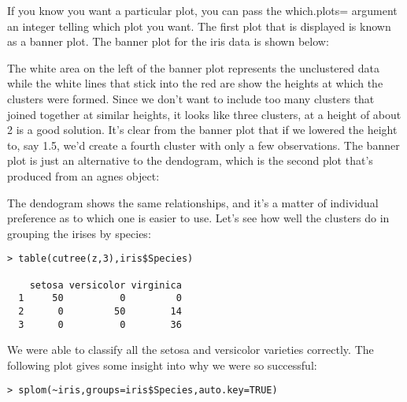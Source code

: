 If you know you want a particular plot, you can pass the which.plots= argument an integer telling which plot you want.
The first plot that is displayed is known as a banner plot. The banner plot for the iris data is shown below:

The white area on the left of the banner plot represents the unclustered data while the white lines that stick into the red are show the heights at which the clusters were formed. Since we don't want to include too many clusters that joined together at similar heights, it looks like three clusters, at a height of about 2 is a good solution. It's clear from the banner plot that if we lowered the height to, say 1.5, we'd create a fourth cluster with only a few observations.
The banner plot is just an alternative to the dendogram, which is the second plot that's produced from an agnes object:

The dendogram shows the same relationships, and it's a matter of individual preference as to which one is easier to use.
Let's see how well the clusters do in grouping the irises by species:
\begin{framed}
\begin{verbatim}
> table(cutree(z,3),iris$Species)
   
    setosa versicolor virginica
  1     50          0         0
  2      0         50        14
  3      0          0        36
\end{verbatim}
\end{framed}
We were able to classify all the setosa and versicolor varieties correctly. The following plot gives some insight into why we were so successful:
\begin{framed}
\begin{verbatim}
> splom(~iris,groups=iris$Species,auto.key=TRUE)
\end{verbatim}
\end{framed}
